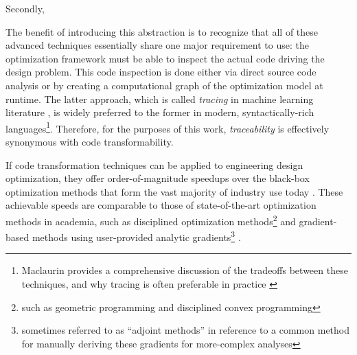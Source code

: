 Secondly,










The benefit of introducing this abstraction is to recognize that all of these advanced techniques essentially share one major requirement to use: the optimization framework must be able to inspect the actual code driving the design problem. This code inspection is done either via direct source code analysis or by creating a computational graph of the optimization model at runtime. The latter approach, which is called \textit{tracing} in machine learning literature \cite{jax, frostig_compiling_2018, baydin_automatic_2018}, is widely preferred to the former in modern, syntactically-rich languages\footnote{Maclaurin provides a comprehensive discussion of the tradeoffs between these techniques, and why tracing is often preferable in practice \cite{maclaurin_modeling_2016}}. Therefore, for the purposes of this work, \textit{traceability} is effectively synonymous with code transformability.

If code transformation techniques can be applied to engineering design optimization, they offer order-of-magnitude speedups over the black-box optimization methods that form the vast majority of industry use today \cite{martins_engineering_2021, lavin_simulation_2022}. These achievable speeds are comparable to those of state-of-the-art optimization methods in academia, such as disciplined optimization methods\footnote{such as geometric programming and disciplined convex programming} \cite{grant_disciplined_2006, gpkit, boyd_convex_2004, agrawal_disciplined_2019} and gradient-based methods using user-provided analytic gradients\footnote{sometimes referred to as ``adjoint methods'' in reference to a common method for manually deriving these gradients for more-complex analyses} \cite{gray_openmdao_2019, kenway_effective_2019, innes_don_2019}.

